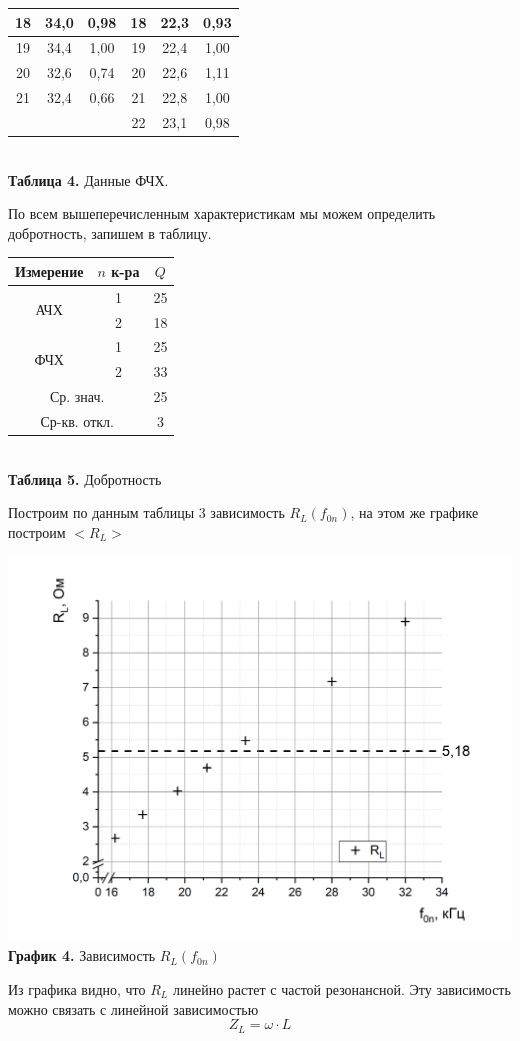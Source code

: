 \documentclass[a4paper, 12pt]{article}%
\begin{document}
\begin{center}
\begin{tabular}{ccc||c|c|c|}
\multicolumn{1}{|c|}{18} & \multicolumn{1}{c|}{34,0} & 0,98 & 18 & 22,3 & 0,93 \\ \hline
\multicolumn{1}{|c|}{19} & \multicolumn{1}{c|}{34,4} & 1,00 & 19 & 22,4 & 1,00 \\ \hline
\multicolumn{1}{|c|}{20} & \multicolumn{1}{c|}{32,6} & 0,74 & 20 & 22,6 & 1,11 \\ \hline
\multicolumn{1}{|c|}{21} & \multicolumn{1}{c|}{32,4} & 0,66 & 21 & 22,8 & 1,00 \\ \hline
 &  &  & 22 & 23,1 & 0,98 \\ \cline{4-6} 
\end{tabular}\\
\textbf{Таблица 4.} Данные ФЧХ.
\end{center}
По всем вышеперечисленным характеристикам мы можем определить добротность, запишем в таблицу.
\begin{center}
\begin{tabular}{|c|c|c|}
\hline
Измерение & $n$ к-ра & $Q$ \\ \hline
\multirow{2}{*}{АЧХ} & 1 & 25 \\ \cline{2-3} 
 & 2 & 18 \\ \hline
\multirow{2}{*}{ФЧХ} & 1 & 25 \\ \cline{2-3} 
 & 2 & 33 \\ \hline
\multicolumn{2}{|c|}{Ср. знач.} & 25 \\ \hline
\multicolumn{2}{|c|}{Ср-кв. откл.} & 3 \\ \hline
\end{tabular}\\
\textbf{Таблица 5.} Добротность
\end{center}
Построим по данным таблицы 3 зависимость $R_L(f_{0n})$, на этом же графике построим $<R_L>$\\
\begin{center}
\includegraphics[width = \textwidth]{5.jpg}\\
  \textbf{График 4.} Зависимость $R_L(f_{0n})$\\
\end{center}
Из графика видно, что $R_L$ линейно растет с частой резонансной. Эту зависимость можно связать с линейной зависимостью
\[Z_L = \omega \cdot L\]
\end{document}
